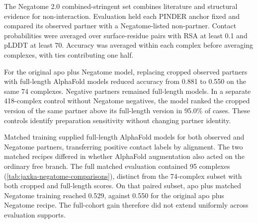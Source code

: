 The Negatome 2.0 combined-stringent set combines literature and structural evidence for non-interaction.\supercite{blohmNegatomeDatabaseNoninteracting2014} Evaluation held each PINDER anchor fixed and compared its observed partner with a Negatome-listed non-partner. Contact probabilities were averaged over surface-residue pairs with RSA at least 0.1 and pLDDT at least 70. Accuracy was averaged within each complex before averaging complexes, with ties contributing one half.

For the original apo plus Negatome model, replacing cropped observed partners with full-length AlphaFold models reduced accuracy from 0.881 to 0.550 on the same 74 complexes. Negative partners remained full-length models. In a separate 418-complex control without Negatome negatives, the model ranked the cropped version of the same partner above its full-length version in 95.0\% of cases. These controls identify preparation sensitivity without changing partner identity.

Matched training supplied full-length AlphaFold models for both observed and Negatome partners, transferring positive contact labels by alignment. The two matched recipes differed in whether AlphaFold augmentation also acted on the ordinary free branch. The full matched evaluation contained 95 complexes (\cref{tab:jaxka-negatome-comparisons}), distinct from the 74-complex subset with both cropped and full-length scores. On that paired subset, apo plus matched Negatome training reached 0.529, against 0.550 for the original apo plus Negatome recipe. The full-cohort gain therefore did not extend uniformly across evaluation supports.

